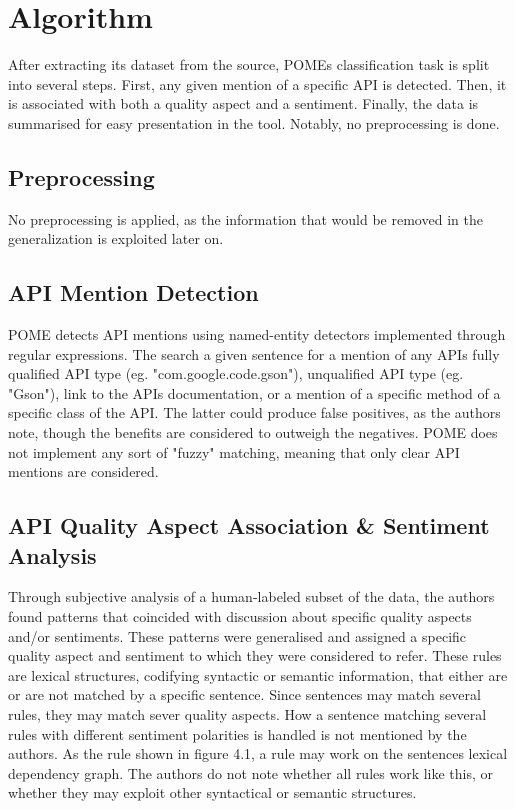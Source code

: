 \documentclass[a4paper,10pt, bibliography=totocnumbered]{scrreprt}
\begin{document}
\section{Algorithm}

After extracting  its dataset  from the  source, POMEs classification task is split into several  steps. First, any given mention of a specific API is detected. Then, it is associated with both a quality aspect and a sentiment. Finally, the data is summarised for easy presentation in the tool. Notably, no preprocessing is done.

\subsection{Preprocessing}

No preprocessing is applied, as the information that would be removed in the generalization is exploited later on.

\subsection{API Mention Detection}

POME detects API mentions using named-entity detectors implemented through regular expressions. The search a given sentence for a mention of any APIs fully qualified API type (eg. "com.google.code.gson"), unqualified API type (eg. "Gson"), link to the APIs documentation, or a mention of a specific method of a specific class of the API. The latter could produce false positives, as the authors note, though the benefits are considered to outweigh the negatives. POME does not implement any sort of "fuzzy" matching, meaning that only clear API mentions are considered.

\subsection{API Quality Aspect Association \& Sentiment Analysis}

Through subjective analysis of a human-labeled subset of the data, the authors found patterns that coincided with discussion about specific quality aspects and/or sentiments. These patterns were generalised and assigned a specific quality aspect and sentiment to which they were considered to refer. These rules are lexical structures, codifying syntactic or semantic information, that either are or are not matched by a specific sentence. Since sentences may match several rules, they may match sever quality aspects. How a sentence matching several rules with different sentiment polarities is handled is not mentioned by the authors. As the rule shown in figure 4.1, a rule may work on the sentences lexical dependency graph. The authors do not note whether all rules work like this, or whether they may exploit other syntactical or semantic structures.
\end{document}

